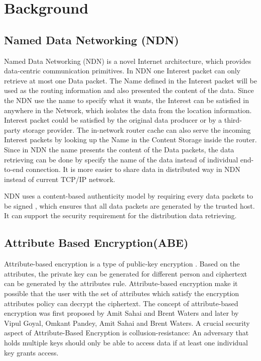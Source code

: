 \section{Background}

\subsection{Named Data Networking (NDN)}
Named Data Networking (NDN) \cite{zhang2014named} is a novel Internet architecture, which provides data-centric communication primitives. In NDN one Interest packet can only retrieve at most one Data packet. The Name defined in the Interest packet will be used as the routing information and also presented the content of the data. Since the NDN use the name to specify what it wants, the Interest can be satisfied in anywhere in the Network, which isolates the data from the location information. Interest packet could be satisfied by the original data producer or by a third-party storage provider. The in-network router cache can also serve the incoming Interest packets by looking up the Name in the Content Storage inside the router. Since in NDN the name presents the content of the Data packets, the data retrieving can be done by specify the name of the data instead of individual end-to-end connection. It is more easier to share data in distributed way in NDN instead of current TCP/IP network.

NDN uses a content-based authenticity model by requiring every data packets to be signed \cite{yu2015name}, which ensures that all data packets are generated by the trusted host. It can support the security requirement for the distribution data retrieving.

\subsection{Attribute Based Encryption(ABE)}
Attribute-based encryption is a type of public-key encryption \cite{brucker2010attribute}. Based on the attributes, the private key can be generated for different person and ciphertext can be generated by the attributes rule. Attribute-based encryption make it possible that the user with the set of attributes which satisfy the encryption attributes policy can decrypt the ciphertext. The concept of attribute-based encryption was first proposed by Amit Sahai and Brent Waters \cite{sahai2005fuzzy} and later by Vipul Goyal, Omkant Pandey, Amit Sahai and Brent Waters\cite{goyal2006attribute}. A crucial security aspect of Attribute-Based Encryption is collusion-resistance: An adversary that holds multiple keys should only be able to access data if at least one individual key grants access.

